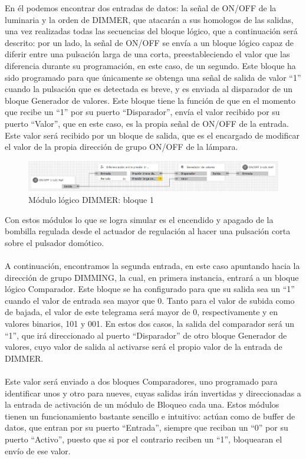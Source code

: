 En él podemos encontrar dos entradas de datos: la señal de ON/OFF de la luminaria y la orden de DIMMER, que atacarán a sus homologos de las salidas, una vez realizadas todas las secuencias del bloque lógico, que a continuación será descrito: por un lado, la señal de ON/OFF se envía a un bloque lógico capaz de diferir entre una pulsación larga de una corta, preestableciendo el valor que las diferencia durante su programación, en este caso, de un segundo. Este bloque ha sido programado para que únicamente se obtenga una señal de salida de valor “1” cuando la pulsación que es detectada es breve, y es enviada al disparador de un bloque Generador de valores. Este bloque tiene la función de que en el momento que recibe un “1” por su puerto “Disparador”, envía el valor recibido por su puerto “Valor”, que en este caso, es la propia señal de ON/OFF de la entrada. Este valor será recibido por un bloque de salida, que es el encargado de modificar el valor de la propia dirección de grupo ON/OFF de la lámpara.
\begin{center}
\begin{figure}[H]
\includegraphics[width=1.15\textwidth]{figures/log_dimm_b1.png}   
\caption{Módulo lógico DIMMER: bloque 1}
\label{fig:log_dimm_b1}
\end{figure}
\end{center}
Con estos módulos lo que se logra simular es el encendido y apagado de la bombilla regulada desde el actuador de regulación al hacer una pulsación corta sobre el pulsador domótico.\\\\
A continuación, encontramos la segunda entrada, en este caso apuntando hacia la dirección de grupo DIMMING, la cual, en primera instancia, entrará a un bloque lógico Comparador. Este bloque se ha configurado para que su salida sea un “1” cuando el valor de entrada sea mayor que 0. Tanto para el valor de subida como de bajada, el valor de este telegrama será mayor de 0, respectivamente y en valores binarios, 101 y 001. En estos dos  casos, la salida del comparador será un “1”, que irá direccionado al puerto “Disparador” de otro bloque Generador de valores, cuyo valor de salida al activarse será el propio valor de la entrada de DIMMER. 
\\\\ Este valor será enviado a dos bloques Comparadores, uno programado para identificar unos y otro para nueves, cuyas salidas irán invertidas y direccionadas a la entrada de activación de un módulo de Bloqueo cada una. Estos módulos tienen un funcionamiento bastante sencillo e intuitivo: actúan como de buffer de datos, que entran por su puerto “Entrada”, siempre que reciban un “0” por su puerto “Activo”, puesto que si por el contrario reciben un “1”, bloquearan el envío de ese valor. 
